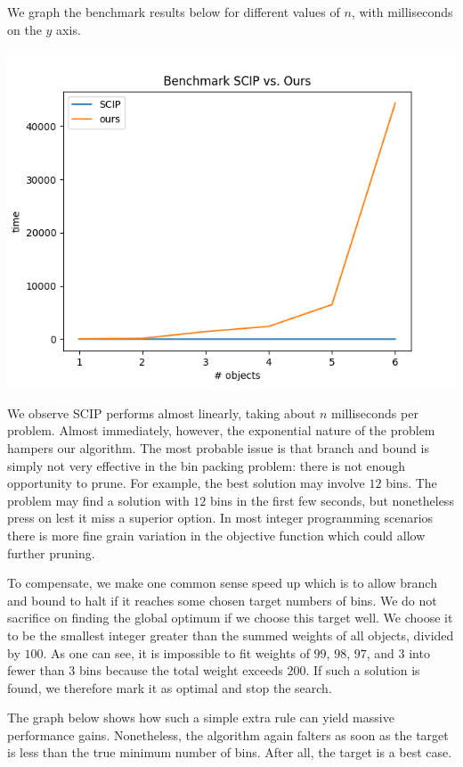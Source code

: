 \documentclass{article}
\begin{document}
We graph the benchmark results below for different values of $n$, with milliseconds on the $y$ axis.

\begin{center}
    \includegraphics[scale=0.5]{benchmark_no_target}
\end{center}

We observe SCIP performs almost linearly, taking about $n$ milliseconds per problem. Almost immediately, however, the exponential nature of the problem hampers our algorithm. The most probable issue is that branch and bound is simply not very effective in the bin packing problem: there is not enough opportunity to prune. For example, the best solution may involve $12$ bins. The problem may find a solution with $12$ bins in the first few seconds, but nonetheless press on lest it miss a superior option. In most integer programming scenarios there is more fine grain variation in the objective function which could allow further pruning.

To compensate, we make one common sense speed up which is to allow branch and bound to halt if it reaches some chosen target numbers of bins. We do not sacrifice on finding the global optimum if we choose this target well. We choose it to be the smallest integer greater than the summed weights of all objects, divided by $100$. As one can see, it is impossible to fit weights of $99$, $98$, $97$, and $3$ into fewer than $3$ bins because the total weight exceeds $200$. If such a solution is found, we therefore mark it as optimal and stop the search.

The graph below shows how such a simple extra rule can yield massive performance gains. Nonetheless, the algorithm again falters as soon as the target is less than the true minimum number of bins. After all, the target is a best case.
\end{document}
